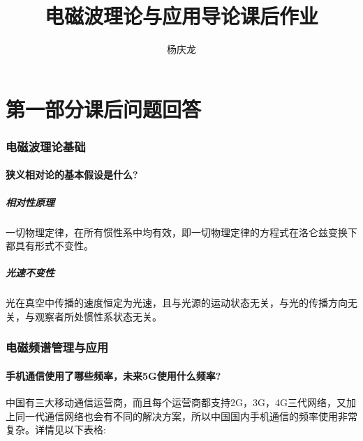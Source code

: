 \documentclass[UTF8]{ctexart}
\begin{document}
\title{电磁波理论与应用导论课后作业}
\author{杨庆龙}
\maketitle

\part{第一部分\quad 课后问题回答}
\section{电磁波理论基础}
\subsection{狭义相对论的基本假设是什么?}
\subsubsection{相对性原理}
一切物理定律，在所有惯性系中均有效，即一切物理定律的方程式在洛仑兹变换下都具有形式不变性。
\subsubsection{光速不变性}
光在真空中传播的速度恒定为光速，且与光源的运动状态无关，与光的传播方向无关，与观察者所处惯性系状态无关。
\section{电磁频谱管理与应用}
\subsection{手机通信使用了哪些频率，未来5G使用什么频率?}
中国有三大移动通信运营商，而且每个运营商都支持2G，3G，4G三代网络，又加上同一代通信网络也会有不同的解决方案，所以中国国内手机通信的频率使用非常复杂。详情见以下表格:
\end{document}
